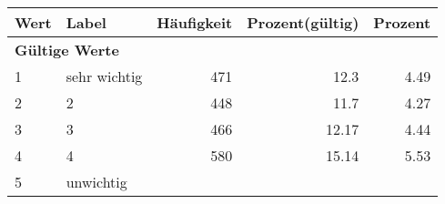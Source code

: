      \begin{longtable}{lXrrr}
     \toprule
     \textbf{Wert} & \textbf{Label} & \textbf{Häufigkeit} & \textbf{Prozent(gültig)} & \textbf{Prozent} \\
     \endhead
     \midrule
     \multicolumn{5}{l}{\textbf{Gültige Werte}}\\

     1 &
     \multicolumn{1}{X}{ sehr wichtig   } &


       \num{471} &
       \num[round-mode=places,round-precision=2]{12.3} &
         \num[round-mode=places,round-precision=2]{4.49} \\

     2 &
     \multicolumn{1}{X}{ 2   } &


       \num{448} &
       \num[round-mode=places,round-precision=2]{11.7} &
         \num[round-mode=places,round-precision=2]{4.27} \\

     3 &
     \multicolumn{1}{X}{ 3   } &


       \num{466} &
       \num[round-mode=places,round-precision=2]{12.17} &
         \num[round-mode=places,round-precision=2]{4.44} \\

     4 &
     \multicolumn{1}{X}{ 4   } &


       \num{580} &
       \num[round-mode=places,round-precision=2]{15.14} &
         \num[round-mode=places,round-precision=2]{5.53} \\

     5 &
     \multicolumn{1}{X}{ unwichtig   } &



\end{longtable}
